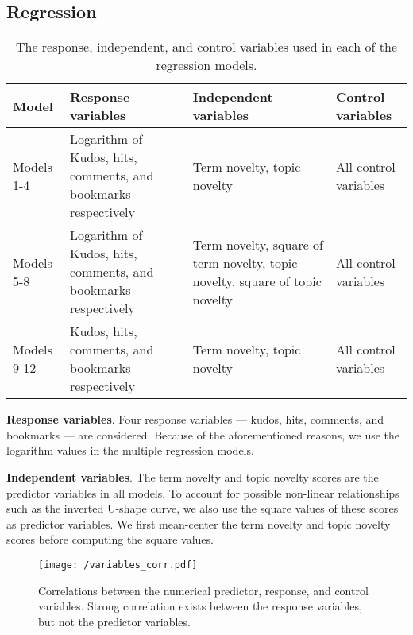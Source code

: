 \documentclass[letterpaper]{article} %
\begin{document}
\subsection{Regression}


\begin{table*}
\centering
\begin{tabular}[width=\textwidth]{p{2cm}p{5cm}p{5cm}p{3cm}}
\toprule
Model & Response variables & Independent variables & Control variables \\ 
   \hline
Models 1-4 & Logarithm of Kudos, hits, comments, and bookmarks respectively & Term novelty, topic novelty & All control variables \\
Models 5-8 & Logarithm of Kudos, hits, comments, and bookmarks respectively & Term novelty, square of term novelty, topic novelty, square of topic novelty & All control variables \\
Models 9-12 & Kudos, hits, comments, and bookmarks respectively & Term novelty, topic novelty & All control variables \\

\bottomrule
\end{tabular}
\caption{The response, independent, and control variables used in each of the regression models.}
\label{tab:reg}
\end{table*}%

\textbf{Response variables}.  Four response variables --- kudos, hits, comments, and bookmarks --- are considered. Because of the aforementioned reasons, we use the logarithm values in the multiple regression models. 



\textbf{Independent variables}. The term novelty and topic novelty scores are the predictor variables in all models. To account for possible non-linear relationships such as the inverted U-shape curve, we also use the square values of these scores as predictor variables. We first mean-center the term novelty and topic novelty scores before computing the square values.

\begin{figure}
    \centering
          \texttt{[image: /variables\_corr.pdf]}
        \caption{Correlations between the numerical predictor, response, and control variables. Strong correlation exists between the response variables, but not the predictor variables. }
        \label{fig:corr}
\end{figure}
\end{document}
